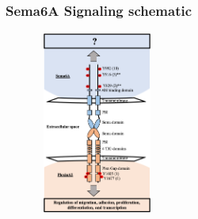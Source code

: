 \documentclass[12pt]{beamer}\usepackage[]{graphicx}\usepackage[]{color}
\begin{document}
\begin{frame}
\frametitle{Sema6A Signaling schematic}
\begin{figure}
   \includegraphics[width=4cm, height=6cm]{Sema6a-plexinA2 signaling with for:rev.png}
\end{figure}
\end{frame}


\end{document}
